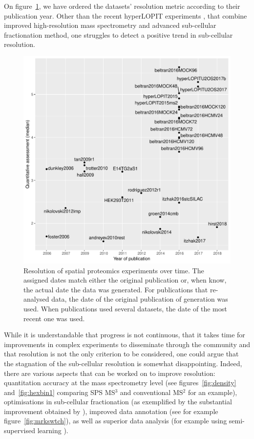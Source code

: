 \documentclass[12pt]{article}\usepackage[]{graphicx}\usepackage[]{color}
\newenvironment{knitrout}{}{} %
\begin{document}
On figure~\ref{fig:restime}, we have ordered the datasets' resolution
metric according to their publication year. Other than the recent
hyperLOPIT experiments \citet{Christoforou:2016}, that combine
improved high-resolution mass spectrometry and advanced sub-cellular
fractionation method, one struggles to detect a positive trend in
sub-cellular resolution.

\begin{figure}[h]
  \centering
\begin{knitrout}
\color{fgcolor}
\includegraphics[width=0.8\linewidth]{figure/restime-1} 

\end{knitrout}
\caption{Resolution of spatial proteomics experiments over time. The
  assigned dates match either the original publication or, when know,
  the actual date the data was generated. For publications that
  re-analysed data, the date of the original publication of generation
  was used. When publications used several datasets, the date of the
  most recent one was used.}
  \label{fig:restime}
\end{figure}


While it is understandable that progress is not continuous, that it
takes time for improvements in complex experiments to disseminate
through the community and that resolution is not the only criterion to
be considered, one could argue that the stagnation of the sub-cellular
resolution is somewhat disappointing. Indeed, there are various
aspects that can be worked on to improve resolution: quantitation
accuracy at the mass spectrometry level (see
figures~\ref{fig:density} and~\ref{fig:hexbin1} comparing SPS MS$^3$
and conventional MS$^2$ for an example), optimisations in sub-cellular
fractionation (as exemplified by the substantial improvement obtained
by \citep{Christoforou:2016}), improved data annotation (see for
example figure~\ref{fig:mrkswtch}), as well as superior data analysis
(for example using semi-supervised learning \citet{Breckels:2013}).
\end{document}
